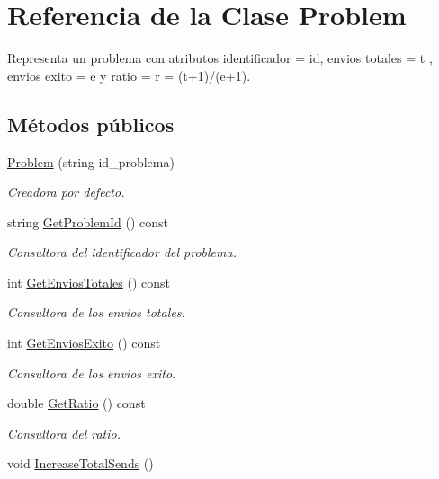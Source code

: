 \hypertarget{class_problem}{}\section{Referencia de la Clase Problem}
\label{class_problem}


Representa un problema con atributos identificador = id, envios totales = t , envios exito = e y ratio = r = (t+1)/(e+1).  


\subsection*{Métodos públicos}
\begin{DoxyCompactItemize}
\item 
\mbox{\hyperlink{class_problem_ad6ccd2727ef6fed802387a29c3a085c0}{Problem}} (string id\+\_\+problema)
\begin{DoxyCompactList}\small\item\em Creadora por defecto. \end{DoxyCompactList}\item 
string \mbox{\hyperlink{class_problem_a953ef8047cd489d36f4a96d10baed4af}{Get\+Problem\+Id}} () const
\begin{DoxyCompactList}\small\item\em Consultora del identificador del problema. \end{DoxyCompactList}\item 
int \mbox{\hyperlink{class_problem_af97fede267d1b9881854f7d8da7be49a}{Get\+Envios\+Totales}} () const
\begin{DoxyCompactList}\small\item\em Consultora de los envios totales. \end{DoxyCompactList}\item 
int \mbox{\hyperlink{class_problem_aff1a49d7c06873886905fc01b5ca024c}{Get\+Envios\+Exito}} () const
\begin{DoxyCompactList}\small\item\em Consultora de los envios exito. \end{DoxyCompactList}\item 
double \mbox{\hyperlink{class_problem_a6aceef9e936ee16ef8368803f22a0268}{Get\+Ratio}} () const
\begin{DoxyCompactList}\small\item\em Consultora del ratio. \end{DoxyCompactList}\item 
void \mbox{\hyperlink{class_problem_a8afb8fba991ac36958733992a67c8ed6}{Increase\+Total\+Sends}} ()

\end{DoxyCompactItemize}
